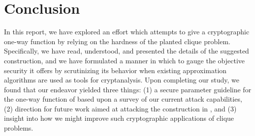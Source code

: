 \documentclass{article}
\theoremstyle{definition}
\begin{document}
\section{Conclusion}

In this report, we have explored an effort \cite{HidingCliques} which attempts to give a 
cryptographic one-way function by relying on the hardness of the planted clique problem.  
Specifically, we have read, understood, and presented the details of the suggested construction, 
and we have formulated a manner in which to gauge the objective security it offers by 
scrutinizing its behavior when existing approximation algorithms are used as tools for 
cryptanalysis.  Upon completing our study, we found that our endeavor 
yielded three things: (1) a secure parameter guideline for the one-way function of \cite{HidingCliques} 
based upon a survey of our current attack capabilities, (2) direction for future work 
aimed at attacking the construction in \cite{HidingCliques}, and (3) insight into how we might 
improve such cryptographic applications of clique problems.



\end{document}
